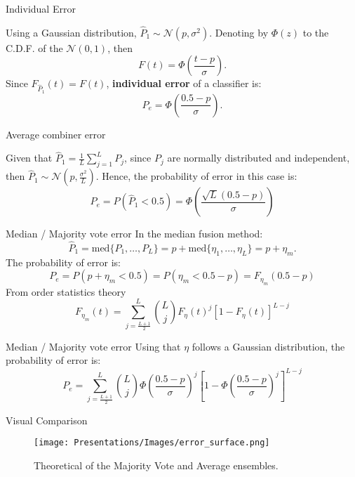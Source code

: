 \documentclass[xcolor=table]{beamer}
\begin{document}
\begin{frame}{Individual Error}

Using a Gaussian distribution, \(\hat P_1 \sim \mathcal N(p,\sigma^2)\). Denoting by \(\Phi(z)\) to the C.D.F. of the \(\mathcal N(0,1)\), then
\[
F(t) = \Phi\left( \frac{t-p}{\sigma}\right).
\]
\pause
Since \(F_{\hat P_1}(t) = F(t)\), \textbf{individual error} of a classifier is:
\[
P_e = \Phi\left( \frac{0.5-p}{\sigma}\right).
\]
    
\end{frame}

\begin{frame}{Average combiner error}

Given that \(\hat P_1 = \frac{1}{L}  \sum_{j=1}^L P_j\), since \(P_j\) are normally distributed and independent, then \(\hat P_1 \sim \mathcal N \left(p, \frac{\sigma^2}{L}\right)\). Hence, the probability of error in this case is:
\[
P_e = P(\hat P_1 < 0.5) = \Phi \left( \frac{\sqrt{L} (0.5 - p)}{\sigma}\right)
\]
    
\end{frame}

\begin{frame}{Median / Majority vote error}
    In the median fusion method:
    \[
    \hat P_1 = \text{med} \{ P_1,\dots,P_L\} = p + \text{med}\{\eta_1,\dots,\eta_L\} = p + \eta_m. 
    \]
    \pause
    The probability of error is:
    \[
    P_e = P(p + \eta_m < 0.5) = P(\eta_m < 0.5 - p) = F_{\eta_m}(0.5 - p)
    \]
    \pause
    From order statistics theory \citep{mood1973introduction}
    \[
    F_{\eta_m}(t) = \sum_{j = \frac{L+1}{2}}^L \binom{L}{j} F_\eta(t)^j[1-F_\eta(t)]^{L-j}
    \]
\end{frame}


\begin{frame}{Median / Majority vote error}
    Using that \(\eta\) follows a Gaussian distribution, the probability of error is:
    \[
    P_e =  \sum_{j = \frac{L+1}{2}}^L \binom{L}{j} \Phi\left(\frac{0.5-p}{\sigma}\right)^j \left[1-\Phi\left(\frac{0.5-p}{\sigma}\right)^j\right]^{L-j}
    \]
\end{frame}

\begin{frame}{Visual Comparison}
    \begin{figure}
        \centering
        \texttt{[image: Presentations/Images/error\_surface.png]}
        \caption{Theoretical of the Majority Vote and Average ensembles.}
    \end{figure}
\end{frame}
\end{document}
